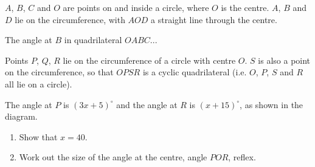 \begin{question}
\noindent $A$, $B$, $C$ and $O$ are points on and inside a circle, where $O$ is the centre. $A$, $B$ and $D$ lie on the circumference, with $AOD$ a straight line through the centre.

\noindent The angle at $B$ in quadrilateral $OABC$... 

\noindent Points $P$, $Q$, $R$ lie on the circumference of a circle with centre $O$. $S$ is also a point on the circumference, so that $OPSR$ is a cyclic quadrilateral (i.e. $O$, $P$, $S$ and $R$ all lie on a circle).

\noindent The angle at $P$ is $(3x+5)^\circ$ and the angle at $R$ is $(x+15)^\circ$, as shown in the diagram.

\begin{center}
\end{center}

\begin{enumerate}
    \item[(a)] Show that $x = 40$.

    \vspace{4.5cm}

    \item[(b)] Work out the size of the angle at the centre, angle $POR$, reflex.

    \vspace{4.5cm}
\end{enumerate}
\end{question}
